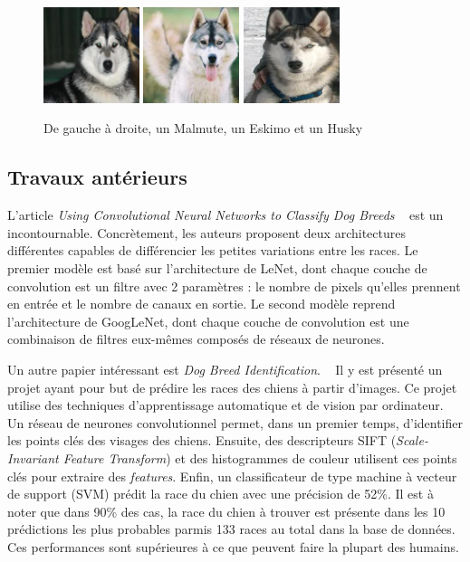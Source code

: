 \documentclass{article}
\begin{document}
\begin{figure}[htbp]
    \includegraphics[width=2.8cm]{../dataset/test/n02110063-malamute/n02110063_11838.jpg}\hfill 
    \includegraphics[width=2.8cm]{../dataset/test/n02109961-Eskimo_dog/n02109961_623.jpg}\hfill 
    \includegraphics[width=2.8cm]{../dataset/test/n02110185-Siberian_husky/n02110185_7564.jpg} 
    \caption{De gauche à droite, un Malmute, un Eskimo et un Husky}
    \label{1}
\end{figure} 

\subsection{Travaux antérieurs}
L'article \textit{Using Convolutional Neural Networks to Classify Dog Breeds}
~\cite{fcdh_FinalReport} est un incontournable. Concrètement, les auteurs
proposent  deux architectures différentes capables de différencier les petites
variations entre les races. Le premier modèle est basé sur l'architecture de 
LeNet, dont chaque couche de convolution est un filtre avec 2 paramètres : le 
nombre de pixels qu’elles prennent en entrée et le nombre de canaux en sortie.
Le second modèle reprend l'architecture de GoogLeNet, dont chaque couche de
convolution est une combinaison de filtres eux-mêmes composés de réseaux de
neurones.

Un autre papier intéressant est \textit{Dog Breed Identification}. 
~\cite{output} Il y est présenté un projet ayant pour but de prédire les races
des chiens à partir d’images. Ce projet utilise des techniques d’apprentissage
automatique et de vision par ordinateur. Un réseau de neurones convolutionnel
permet, dans un premier temps, d’identifier les points clés des visages des 
chiens. Ensuite, des descripteurs SIFT (\textit{Scale-Invariant Feature
Transform}) et des histogrammes de couleur utilisent ces points clés pour
extraire des \textit{features}. Enfin, un classificateur de type machine à
vecteur de support (SVM) prédit la race du chien avec une précision de 52\%. Il
est à noter que dans 90\% des cas, la race du chien à trouver est présente dans
les 10 prédictions les plus probables parmis 133 races au total dans la base de 
données. Ces performances sont supérieures à ce que peuvent faire la plupart
des humains.
\end{document}
